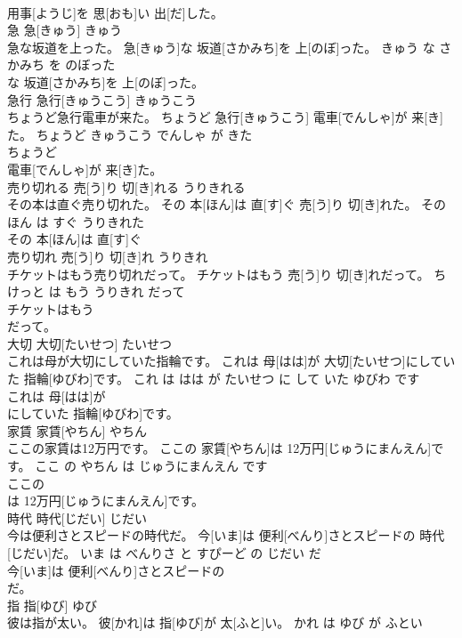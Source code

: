 \documentclass[8pt]{extreport}
\begin{document}
\begin{CJK}{UTF8}{min}
\\	用事[ようじ]を 思[おも]い 出[だ]した。			
\\	急	急[きゅう]	きゅう	
\\	急な坂道を上った。	急[きゅう]な 坂道[さかみち]を 上[のぼ]った。	きゅう な さかみち を のぼった	
\\	な 坂道[さかみち]を 上[のぼ]った。			
\\	急行	急行[きゅうこう]	きゅうこう	
\\	ちょうど急行電車が来た。	ちょうど 急行[きゅうこう] 電車[でんしゃ]が 来[き]た。	ちょうど きゅうこう でんしゃ が きた	
\\	ちょうど
\\	電車[でんしゃ]が 来[き]た。			
\\	売り切れる	売[う]り 切[き]れる	うりきれる	
\\	その本は直ぐ売り切れた。	その 本[ほん]は 直[す]ぐ 売[う]り 切[き]れた。	その ほん は すぐ うりきれた	
\\	その 本[ほん]は 直[す]ぐ
\\	売り切れ	売[う]り 切[き]れ	うりきれ	
\\	チケットはもう売り切れだって。	チケットはもう 売[う]り 切[き]れだって。	ちけっと は もう うりきれ だって	
\\	チケットはもう
\\	だって。			
\\	大切	大切[たいせつ]	たいせつ	
\\	これは母が大切にしていた指輪です。	これは 母[はは]が 大切[たいせつ]にしていた 指輪[ゆびわ]です。	これ は はは が たいせつ に して いた ゆびわ です	
\\	これは 母[はは]が
\\	にしていた 指輪[ゆびわ]です。			
\\	家賃	家賃[やちん]	やちん	
\\	ここの家賃は12万円です。	ここの 家賃[やちん]は 12万円[じゅうにまんえん]です。	ここ の やちん は じゅうにまんえん です	
\\	ここの
\\	は 12万円[じゅうにまんえん]です。			
\\	時代	時代[じだい]	じだい	
\\	今は便利さとスピードの時代だ。	今[いま]は 便利[べんり]さとスピードの 時代[じだい]だ。	いま は べんりさ と すぴーど の じだい だ	
\\	今[いま]は 便利[べんり]さとスピードの
\\	だ。			
\\	指	指[ゆび]	ゆび	
\\	彼は指が太い。	彼[かれ]は 指[ゆび]が 太[ふと]い。	かれ は ゆび が ふとい	

\end{CJK}
\end{document}
